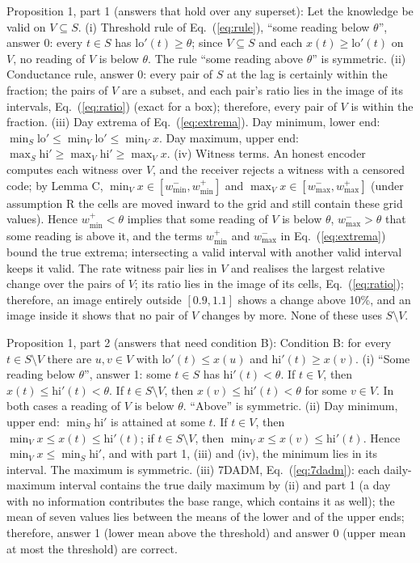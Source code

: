 Proposition 1, part 1 (answers that hold over any superset): Let the knowledge be valid on $V \subseteq S$. (i) Threshold rule of Eq.~(\ref{eq:rule}), ``some reading below $\theta$'', answer 0: every $t \in S$ has $\mathrm{lo}'(t) \ge \theta$; since $V \subseteq S$ and each $x(t) \ge \mathrm{lo}'(t)$ on $V$, no reading of $V$ is below $\theta$. The rule ``some reading above $\theta$'' is symmetric. (ii) Conductance rule, answer 0: every pair of $S$ at the lag is certainly within the fraction; the pairs of $V$ are a subset, and each pair's ratio lies in the image of its intervals, Eq.~(\ref{eq:ratio}) (exact for a box); therefore, every pair of $V$ is within the fraction. (iii) Day extrema of Eq.~(\ref{eq:extrema}). Day minimum, lower end: $\min_{S} \mathrm{lo}' \le \min_{V} \mathrm{lo}' \le \min_{V} x$. Day maximum, upper end: $\max_{S} \mathrm{hi}' \ge \max_{V} \mathrm{hi}' \ge \max_{V} x$. (iv) Witness terms. An honest encoder computes each witness over $V$, and the receiver rejects a witness with a censored code; by Lemma C, $\min_V x \in [w^{-}_{\min}, w^{+}_{\min}]$ and $\max_V x \in [w^{-}_{\max}, w^{+}_{\max}]$ (under assumption R the cells are moved inward to the grid and still contain these grid values). Hence $w^{+}_{\min} < \theta$ implies that some reading of $V$ is below $\theta$, $w^{-}_{\max} > \theta$ that some reading is above it, and the terms $w^{+}_{\min}$ and $w^{-}_{\max}$ in Eq.~(\ref{eq:extrema}) bound the true extrema; intersecting a valid interval with another valid interval keeps it valid. The rate witness pair lies in $V$ and realises the largest relative change over the pairs of $V$; its ratio lies in the image of its cells, Eq.~(\ref{eq:ratio}); therefore, an image entirely outside $[0.9, 1.1]$ shows a change above 10\%, and an image inside it shows that no pair of $V$ changes by more. None of these uses $S \setminus V$.

Proposition 1, part 2 (answers that need condition B): Condition B: for every $t \in S \setminus V$ there are $u, v \in V$ with $\mathrm{lo}'(t) \le x(u)$ and $\mathrm{hi}'(t) \ge x(v)$. (i) ``Some reading below $\theta$'', answer 1: some $t \in S$ has $\mathrm{hi}'(t) < \theta$. If $t \in V$, then $x(t) \le \mathrm{hi}'(t) < \theta$. If $t \in S \setminus V$, then $x(v) \le \mathrm{hi}'(t) < \theta$ for some $v \in V$. In both cases a reading of $V$ is below $\theta$. ``Above'' is symmetric. (ii) Day minimum, upper end: $\min_{S} \mathrm{hi}'$ is attained at some $t$. If $t \in V$, then $\min_V x \le x(t) \le \mathrm{hi}'(t)$; if $t \in S \setminus V$, then $\min_V x \le x(v) \le \mathrm{hi}'(t)$. Hence $\min_V x \le \min_S \mathrm{hi}'$, and with part 1, (iii) and (iv), the minimum lies in its interval. The maximum is symmetric. (iii) 7DADM, Eq.~(\ref{eq:7dadm}): each daily-maximum interval contains the true daily maximum by (ii) and part 1 (a day with no information contributes the base range, which contains it as well); the mean of seven values lies between the means of the lower and of the upper ends; therefore, answer 1 (lower mean above the threshold) and answer 0 (upper mean at most the threshold) are correct.

